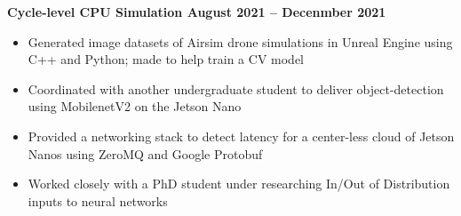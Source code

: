 \documentclass[../main.tex]{subfiles}
\begin{document}
\noindent\textbf{{\fontsize{12}{14}\selectfont Cycle-level CPU Simulation \hfill August 2021 – Decenmber 2021}}\newline
\vspace{-\topsep}
\begin{itemize}
  \setlength{\itemindent}{-6mm}
  \vspace{-0.2cm}\item Generated image datasets of Airsim drone simulations in Unreal Engine using C++ and Python; made to help train a CV model
  \vspace{-0.2cm}\item Coordinated with another undergraduate student to deliver object-detection using MobilenetV2 on the Jetson Nano
  \vspace{-0.2cm}\item Provided a networking stack to detect latency for a center-less cloud of Jetson Nanos using ZeroMQ and Google Protobuf
  \vspace{-0.2cm}\item Worked closely with a PhD student under researching In/Out of Distribution inputs to neural networks
\end{itemize}
\end{document}
